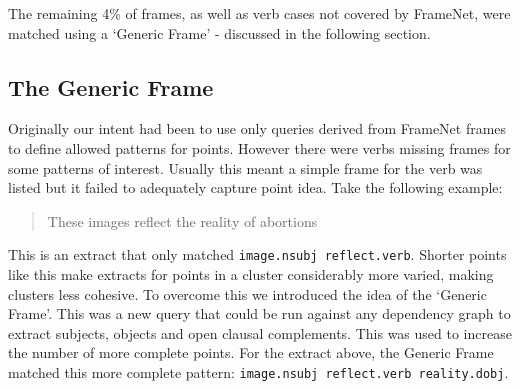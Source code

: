       The remaining 4\% of frames, as well as verb cases not covered by FrameNet, were matched using a `Generic Frame' - discussed in the following section.

    \tocless\subsection{The Generic Frame}
      Originally our intent had been to use only queries derived from FrameNet frames to define allowed patterns for points. However there were verbs missing frames for some patterns of interest. Usually this meant a simple frame for the verb was listed but it failed to adequately capture point idea. Take the following example:

      \bigskip
      \begin{center}
        \blockquote{These images reflect the reality of abortions}
      \end{center}

      This is an extract that only matched \texttt{image.nsubj reflect.verb}. Shorter points like this make extracts for points in a cluster considerably more varied, making clusters less cohesive. To overcome this we introduced the idea of the `Generic Frame'. This was a new query that could be run against any dependency graph to extract subjects, objects and open clausal complements. This was used to increase the number of more complete points. For the extract above, the Generic Frame matched this more complete pattern: \texttt{image.nsubj reflect.verb reality.dobj}.

